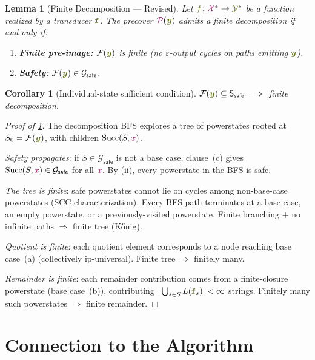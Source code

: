 \documentclass{article}
\newcommand{\mymacro}[1]{#1}
\newcommand{\preCover}{{\color{TokenColor}\mathcal{P}}}
\newcommand{\transFnSym}[0]{f}
\newcommand{\transFn}{\ensuremath{{\color{CharacterColor}\transFnSym}}\xspace}
\newcommand{\srcSym}{{\color{TokenColor}x}}
\newcommand{\tgtStr}{{\color{CharacterColor}\boldsymbol{y}}}
\newcommand{\srcAlphabet}[0]{{\color{TokenColor}\ensuremath{\mathcal{X}}}\xspace}
\newcommand{\tgtAlphabet}[0]{{\color{CharacterColor}\ensuremath{\mathcal{Y}}}\xspace}
\newcommand{\srcStrings}[0]{\ensuremath{\srcAlphabet^*}\xspace}
\newcommand{\tgtStrings}[0]{\ensuremath{\tgtAlphabet^*}\xspace}
\newcommand{\transST}{{\color{CharacterColor}\texttt{f}}}
\newcommand{\States}{\mymacro{\mathsf{S}}}
\newcommand{\state}{\mymacro{s}}
\newcommand{\frontier}{\mathcal{F}}
\newcommand{\powerstate}{S}
\newcommand{\SafeStates}{\States_{\mathsf{safe}}}
\newcommand{\SafePower}{\mathcal{G}_{\mathsf{safe}}}
\newcommand{\Succ}{\mathrm{Succ}}
\theoremstyle{plain}
\newtheorem{lemma}[theorem]{Lemma}
\newtheorem{corollary}[theorem]{Corollary}
\begin{document}
\begin{lemma}[Finite Decomposition --- Revised]
\label{lemma:revised}
Let $\transFn\colon \srcStrings \to \tgtStrings$ be a function realized by a
transducer $\transST$.  The precover $\preCover(\tgtStr)$ admits a finite
decomposition if and only if:
\begin{enumerate}
\item [(i)] \textbf{Finite pre-image:} $\frontier(\tgtStr)$ is
  finite (no $\varepsilon$-output cycles on paths emitting $\tgtStr$).
\item [(ii)] \textbf{Safety:} $\frontier(\tgtStr) \in \SafePower$.
\end{enumerate}
\end{lemma}

\begin{corollary}[Individual-state sufficient condition]
$\frontier(\tgtStr) \subseteq \SafeStates \implies$ finite decomposition.
\end{corollary}

\begin{proof}[Proof of \cref{lemma:revised}]
The decomposition BFS explores a tree of powerstates rooted at
$\powerstate_0 = \frontier(\tgtStr)$, with children $\Succ(\powerstate, \srcSym)$.

\emph{Safety propagates}: if $\powerstate \in \SafePower$ is not a base case,
clause~(c) gives $\Succ(\powerstate, \srcSym) \in \SafePower$ for all $\srcSym$.
By (ii), every powerstate in the BFS is safe.

\emph{The tree is finite}: safe powerstates cannot lie on cycles among
non-base-case powerstates (SCC characterization).  Every BFS path terminates at
a base case, an empty powerstate, or a previously-visited powerstate.  Finite
branching + no infinite paths $\Rightarrow$ finite tree (K\H{o}nig).

\emph{Quotient is finite}: each quotient element corresponds to a node reaching
base case~(a) (collectively ip-universal).  Finite tree $\Rightarrow$ finitely many.

\emph{Remainder is finite}: each remainder contribution comes from a
finite-closure powerstate (base case~(b)), contributing $|\bigcup_{\state \in
\powerstate} L(\transST_\state)| < \infty$ strings.  Finitely many such
powerstates $\Rightarrow$ finite remainder.
\end{proof}


\section{Connection to the Algorithm}
\label{sec:connection}
\end{document}

